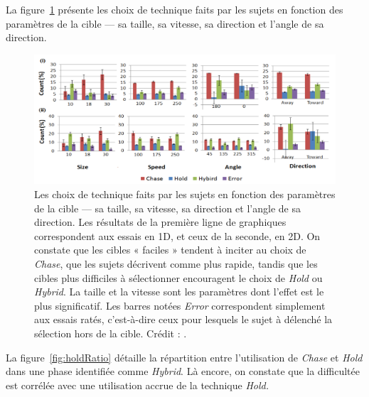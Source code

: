 	La figure~\ref{fig:holdTech} présente les choix de technique faits par les sujets en fonction des paramètres de la cible --- sa taille, sa vitesse, sa direction et l'angle de sa direction.
	
	\begin{figure}[H]
		\centering
		\includegraphics[width=\textwidth]{figures/ch2/holdTech}
		\caption[\emph{Hold} --- choix de la technique]{Les choix de technique faits par les sujets en fonction des paramètres de la cible --- sa taille, sa vitesse, sa direction et l'angle de sa direction. Les résultats de la première ligne de graphiques correspondent aux essais en 1D, et ceux de la seconde, en 2D. On constate que les cibles « faciles » tendent à inciter au choix de \emph{Chase}, que les sujets décrivent comme plus rapide, tandis que les cibles plus difficiles à sélectionner encouragent le choix de \emph{Hold} ou \emph{Hybrid}. La taille et la vitesse sont les paramètres dont l'effet est le plus significatif. Les barres notées \emph{Error} correspondent simplement aux essais ratés, c'est-à-dire ceux pour lesquels le sujet à délenché la sélection hors de la cible. Crédit : \cite{hajri2011moving}.}
		\label{fig:holdTech}
	\end{figure}
	
	La figure~\ref{fig:holdRatio} détaille la répartition entre l'utilisation de \emph{Chase} et \emph{Hold} dans une phase identifiée comme \emph{Hybrid}. Là encore, on constate que la difficultée est corrélée avec une utilisation accrue de la technique \emph{Hold.}
	
